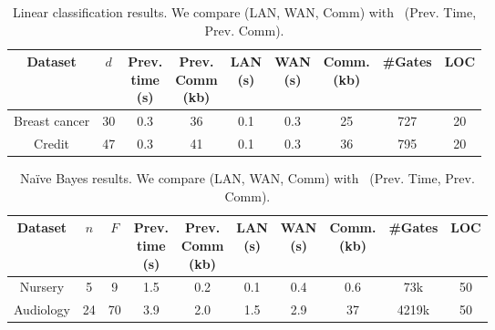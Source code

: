 \setlength\tabcolsep{2.8pt}
\begin{table}
\begin{tabular}{|c|c|c|c|c|c|c|c|c|}
\hline
Dataset & $d$  & \thead{Prev. \\ time\\ (s)} & \thead{Prev. \\ Comm\\ (kb)} & \thead{LAN  \\ (s)} & \thead{WAN\\ (s)} & \thead{Comm. \\(kb)}  &  \#Gates & LOC\\
\hline
Breast cancer & 30 & 0.3 & 36 & 0.1 & 0.3 & 25  & 727 & 20\\
\hline
Credit & 47 & 0.3 & 41 & 0.1 & 0.3 & 36  & 795 & 20\\
\hline
\end{tabular}
 \caption{Linear classification results. We compare \tool (LAN, WAN, Comm)
 with~\cite{shafindss} (Prev. Time, Prev. Comm).}
 \label{tab:lc} 
\end{table}




\setlength\tabcolsep{2.5pt}
\begin{table}
\begin{tabular}{|c|c|c|c|c|c |c|c|c|c|}
\hline
Dataset & $n$ & $F$ & \thead{Prev. \\ time\\ (s)} & \thead{Prev. \\ Comm\\ (kb)} & \thead{LAN  \\ (s)} & \thead{WAN\\ (s)} & \thead{Comm. \\(kb)} & \#Gates  & LOC\\
\hline
Nursery & 5 & 9 & 1.5 & 0.2 & 0.1 & 0.4 & 0.6  & 73k & 50\\
\hline
Audiology & 24 & 70 & 3.9 & 2.0 & 1.5 & 2.9 & 37  & 4219k & 50\\
\hline
\end{tabular}
\caption{Na\"{i}ve Bayes results. We compare \tool (LAN, WAN, Comm)
 with~\cite{shafindss} (Prev. Time, Prev. Comm).}
 \label{tab:nb} 
\end{table}








